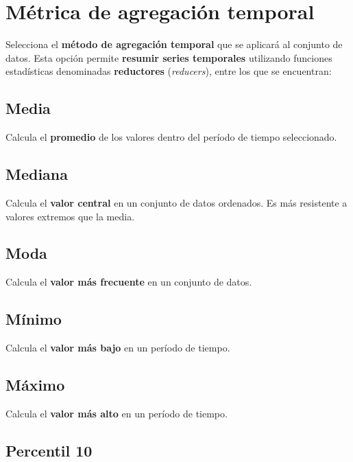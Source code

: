 \documentclass[
]{book}
\begin{document}
\chapter{Métrica de agregación temporal}\label{agregacion-temporal}

Selecciona el \textbf{método de agregación temporal} que se aplicará al conjunto de datos. Esta opción permite \textbf{resumir series temporales} utilizando funciones estadísticas denominadas \textbf{reductores} (\emph{reducers}), entre los que se encuentran:

\section{\texorpdfstring{\textbf{Media}}{Media}}\label{media}

Calcula el \textbf{promedio} de los valores dentro del período de tiempo seleccionado.

\section{\texorpdfstring{\textbf{Mediana}}{Mediana}}\label{mediana}

Calcula el \textbf{valor central} en un conjunto de datos ordenados. Es más resistente a valores extremos que la media.

\section{\texorpdfstring{\textbf{Moda}}{Moda}}\label{moda}

Calcula el \textbf{valor más frecuente} en un conjunto de datos.

\section{\texorpdfstring{\textbf{Mínimo}}{Mínimo}}\label{muxednimo}

Calcula el \textbf{valor más bajo} en un período de tiempo.

\section{\texorpdfstring{\textbf{Máximo}}{Máximo}}\label{muxe1ximo}

Calcula el \textbf{valor más alto} en un período de tiempo.

\section{\texorpdfstring{\textbf{Percentil 10}}{Percentil 10}}\label{percentil-10}
\end{document}
